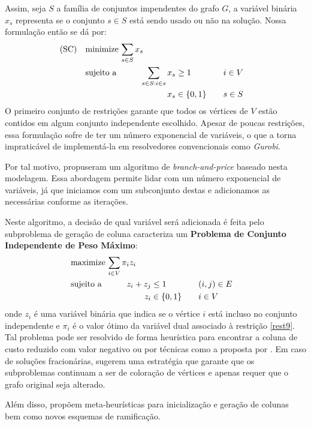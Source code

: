 \documentclass[11pt]{article}
\begin{document}
Assim, seja \(S\) a família de conjuntos impendentes do grafo \(G\), a variável binária \(x_s\) representa se o conjunto \(s \in S\) está sendo usado ou não na solução.
Nossa formulação então se dá por:
\begin{alignat}{4}
\mathrm{(SC)} \quad & \omit\rlap{minimize  $\displaystyle \sum_{s \in S} x_s$} \nonumber \\
& \mbox{sujeito a}&& \quad & \sum_{s \in S: i \in s} x_{s}&\geq 1 & \quad & i \in V \label{rest9} \\
&                 &&   & x_s       & \in \{0,1\} &    & s \in S \nonumber
\end{alignat}
O primeiro conjunto de restrições garante que todos os vértices de \(V\) estão contidos em algum conjunto independente escolhido.
Apesar de poucas restrições, essa formulação sofre de ter um número exponencial de variáveis, o que a torna impraticável de implementá-la em resolvedores convencionais como \emph{Gurobi}.

Por tal motivo, \textcite{Mehrotra1996ColumnGenerationApproach} propuseram um algoritmo de \emph{branch-and-price} baseado nesta modelagem.
Essa abordagem permite lidar com um número exponencial de variáveis, já que iniciamos com um subconjunto destas e adicionamos as necessárias conforme as iterações.

Neste algoritmo, a decisão de qual variável será adicionada é feita pelo subproblema de geração de coluna caracteriza um \textbf{Problema de Conjunto Independente de Peso Máximo}:
\begin{alignat*}{4}
& \omit\rlap{maximize  $\displaystyle \sum_{i \in V} \pi_i z_i$} \\
& \mbox{sujeito a}&& \quad & z_i + z_j &\leq 1 & \quad & (i,j) \in E \\
&                 &&   & z_i       & \in \{0,1\} &    & i \in V
\end{alignat*}
onde \(z_i\) é uma variável binária que indica se o vértice \(i\) está incluso no conjunto independente e \(\pi_i\) é o valor ótimo da variável dual associado à restrição \eqref{rest9}.
Tal problema pode ser resolvido de forma heurística para encontrar a coluna de custo reduzido com valor negativo ou por técnicas como a proposta por \textcite{Held2012Maximumweightstable}.
Em caso de soluções fracionárias, \textcite{Mehrotra1996ColumnGenerationApproach} sugerem uma estratégia que garante que os subproblemas continuam a ser de coloração de vértices e apenas requer que o grafo original seja alterado.

Além disso, \textcite{Malaguti2011ExactApproachVertex} propõem meta-heurísticas para inicialização e geração de colunas bem como novos esquemas de ramificação.
\end{document}
